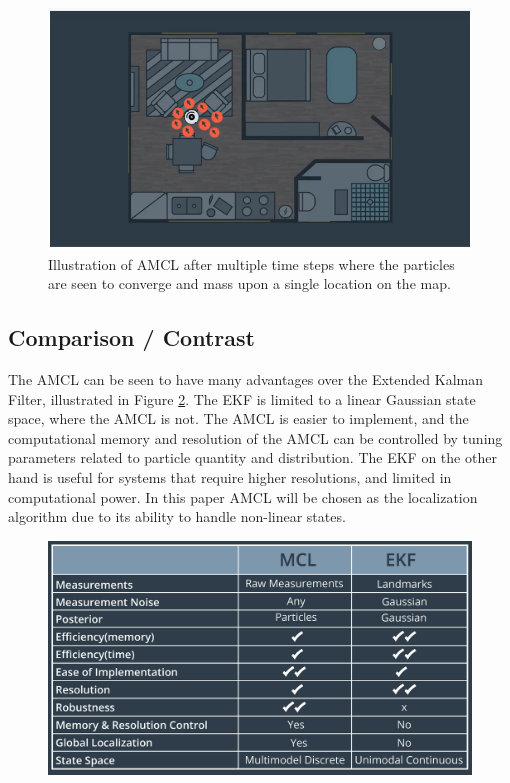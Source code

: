 \documentclass[10pt,journal,compsoc]{IEEEtran}
\begin{document}
\begin{figure}[thpb]
    \centering
    \includegraphics[width=\linewidth]{../img/amcl_particles.png}
    \caption{Illustration of AMCL after multiple time steps where the particles are seen to converge and mass upon a single location on the map.}
    \label{fig:AMCL_particles}
\end{figure}

\subsection{Comparison / Contrast}
The AMCL can be seen to have many advantages over the Extended Kalman Filter, illustrated in Figure \ref{fig:FilterComparision}. The EKF is limited to a linear Gaussian state space, where the AMCL is not. The AMCL is easier to implement, and the computational memory and resolution of the AMCL can be controlled by tuning parameters related to particle quantity and distribution. The EKF on the other hand is useful for systems that require higher resolutions, and limited in computational power. In this paper AMCL will be chosen as the localization algorithm due to its ability to handle non-linear states.

\begin{figure}[thpb]
    \centering
    \includegraphics[width=\linewidth]{../img/mclvsekf.png}
    \caption{}
    \label{fig:FilterComparision}
\end{figure}
\end{document}
